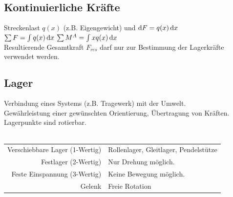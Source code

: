 \documentclass[fs, footer]{latex4ei}
\begin{document}
\begin{multicols}{4}
	
	
	\subsection{Kontinuierliche Kräfte }
	Streckenlast $q(x)$ (z.B. Eigengewicht) und $\diff F = q(x) \diff x$\\
	$\sum F = \int q(x) \diff x$ \qquad $\sum M^A = \int x q(x) \diff x$\\
	Resultierende Gesamtkraft $F_{res}$ darf nur zur Bestimmung der Lagerkräfte verwendet werden.



	
	\subsection{Lager}
	Verbindung eines Systems (z.B. Tragewerk) mit der Umwelt.\\
	Gewährleistung einer gewünschten Orientierung, Übertragung von Kräften.\\
	Lagerpunkte sind rotierbar.\\ \\
	\begin{tabular}{rl}
	Verschiebbare Lager (1-Wertig) & Rollenlager, Gleitlager, Pendelstütze\\
	Festlager (2-Wertig) &  Nur Drehung möglich.\\
	Feste Einspannung (3-Wertig) & Keine Bewegung möglich.\\
	Gelenk & Freie Rotation\\
	

\end{tabular}
\end{multicols}
\end{document}
